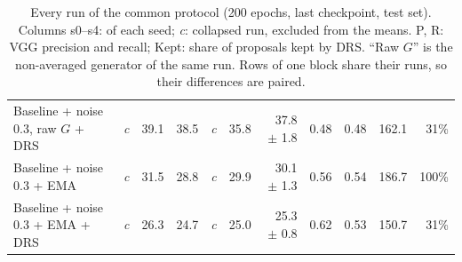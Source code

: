 \begin{table}[H]
\begin{tabular}{lrrrrrrrrrr}
Baseline + noise 0.3, raw $G$ + DRS & \textit{c} & 39.1 & 38.5 & \textit{c} & 35.8 & 37.8 $\pm$ 1.8 & 0.48 & 0.48 & 162.1 & 31\% \\
Baseline + noise 0.3 + EMA & \textit{c} & 31.5 & 28.8 & \textit{c} & 29.9 & 30.1 $\pm$ 1.3 & 0.56 & 0.54 & 186.7 & 100\% \\
Baseline + noise 0.3 + EMA + DRS & \textit{c} & 26.3 & 24.7 & \textit{c} & 25.0 & 25.3 $\pm$ 0.8 & 0.62 & 0.53 & 150.7 & 31\% \\
\bottomrule
\end{tabular}
\caption{Every run of the common protocol (200 epochs, last checkpoint, test set). Columns s0--s4: \finc{} of each seed; \textit{c}: collapsed run, excluded from the means. P, R: VGG precision and recall; Kept: share of proposals kept by DRS. ``Raw $G$'' is the non-averaged generator of the same run. Rows of one block share their runs, so their differences are paired.}
\label{tab:supp-common}
\end{table}
